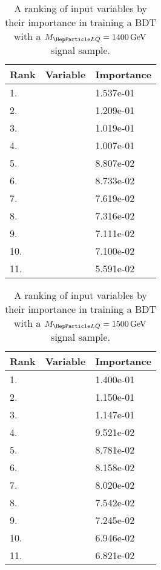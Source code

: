 \begin{table}[H]
	\caption{A ranking of input variables by their importance in training a BDT with a $\MLQ = \SI{1400}{GeV}$ signal sample.}
	\begin{center}
		\begin{tabular}{lll} \hline \hline
			Rank & Variable & Importance  \\ \hline
			1. & \MujTwo & 1.537e-01 \\
			2. & \MujOne & 1.209e-01 \\
			3. & \ST & 1.019e-01 \\
			4. & \Muujj & 1.007e-01 \\
			5. & \ptof{\PmuTwo} & 8.807e-02 \\
			6. & \ptof{\PjTwo} & 8.733e-02 \\
			7. & \ptof{\PmuOne} & 7.619e-02 \\
			8. & \ptof{\PjOne} & 7.316e-02 \\
			9. & \Muu & 7.111e-02 \\
			10. & \DRof{\PmuOne+\PmuTwo}{\PjOne} & 7.100e-02 \\
			11. & \MET & 5.591e-02 \\ \hline \hline
		\end{tabular}
		\label{tab:bdtRank1400}
	\end{center}
\end{table}

\begin{table}[H]
	\caption{A ranking of input variables by their importance in training a BDT with a $\MLQ = \SI{1500}{GeV}$ signal sample.}
	\begin{center}
		\begin{tabular}{lll} \hline \hline
			Rank & Variable & Importance  \\ \hline
			1. & \MujTwo & 1.400e-01 \\
			2. & \ST & 1.150e-01 \\
			3. & \MujOne & 1.147e-01 \\
			4. & \Muujj & 9.521e-02 \\
			5. & \Muu & 8.781e-02 \\
			6. & \ptof{\PjTwo} & 8.158e-02 \\
			7. & \ptof{\PmuTwo} & 8.020e-02 \\
			8. & \ptof{\PmuOne} & 7.542e-02 \\
			9. & \MET & 7.245e-02 \\
			10. & \ptof{\PjOne} & 6.946e-02 \\
			11. & \DRof{\PmuOne+\PmuTwo}{\PjOne} & 6.821e-02 \\ \hline \hline
		\end{tabular}
		\label{tab:bdtRank1500}
	\end{center}
\end{table}

